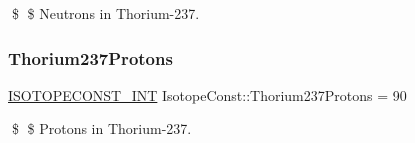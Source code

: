 \$ \$ Neutrons in Thorium-\/237. \mbox{\label{group___isotope_const-_thorium-_th237_gadb61c1d19c7e4119a329e3f3829a2f81}} 
\subsubsection{\texorpdfstring{Thorium237\+Protons}{Thorium237Protons}}
{\footnotesize\ttfamily \mbox{\hyperlink{group___isotope_const-_macros_ga5f18360b3e99483a35c32d789e62621c}{I\+S\+O\+T\+O\+P\+E\+C\+O\+N\+S\+T\+\_\+\+I\+NT}} Isotope\+Const\+::\+Thorium237\+Protons = 90}

\$ \$ Protons in Thorium-\/237. 